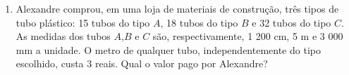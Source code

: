 \documentclass[a4paper,14pt]{article}
\begin{document}
\begin{multicols}{2}
\begin{enumerate}
\begin{enumerate}[a)]
			\end{enumerate}
			\item Alexandre comprou, em uma loja de materiais de construção, três tipos de tubo plástico: 15 tubos do tipo $A$, 18 tubos do tipo $B$ e 32 tubos do tipo $C$. \\
			As medidas dos tubos $A$,$B$ e $C$ são, respectivamente, 1 200 cm, 5 m e 3 000 mm a unidade. O metro de qualquer tubo, independentemente do tipo escolhido, custa 3 reais. Qual o valor pago por Alexandre?
		\end{enumerate}
		$~$ \\ $~$ \\ $~$ \\ $~$ \\ $~$ \\ $~$ \\ $~$ \\ $~$ \\ $~$ \\ $~$ \\ $~$ \\ $~$ \\ $~$ \\ $~$ \\ $~$ \\ $~$ \\ $~$ \\ $~$ \\ $~$ \\ $~$ \\ $~$ \\ $~$ \\ $~$ \\ $~$ \\ $~$ \\ $~$ \\ $~$ \\ $~$ \\ $~$
	\end{multicols}
\end{document}
